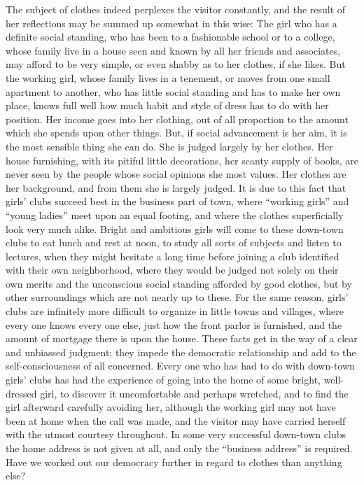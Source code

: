 \documentclass[]{article}
\begin{document}
\begin{sectionbody}
\addamsparagraph The subject of clothes indeed perplexes the visitor constantly, and the
result of her reflections may be summed up somewhat in this wise: The
girl who has a definite social standing, who has been to a fashionable
school or to a college, whose family live in a house seen and known by
all her friends and associates, may afford to be very simple, or even
shabby as to her clothes, if she likes. But the working girl, whose
family lives in a tenement, or moves from one small apartment to
another, who has little social standing and has to make her own place,
knows full well how much habit and style of dress has to do with her
position. Her income goes into her clothing, out of all proportion to
the amount which she spends upon other things. But, if social
advancement is her aim, it is the most sensible thing she can do. She is
judged largely by her clothes. Her house furnishing, with its pitiful
little decorations, her scanty supply of books, are never seen by the
people whose social opinions she most values. Her clothes are her
background, and from them she is largely judged. It is due to this fact
that girls' clubs succeed best in the business part of town, where
``working girls'' and ``young ladies'' meet upon an equal footing, and where
the clothes superficially look very much alike. Bright and ambitious
girls will come to these down-town clubs to eat lunch and rest at noon,
to study all sorts of subjects and listen to lectures, when they might
hesitate a long time before joining a club identified with their own
neighborhood, where they would be judged not solely on their own merits
and the unconscious social standing afforded by good clothes, but by
other surroundings which are not nearly up to these. For the same
reason, girls' clubs are infinitely more difficult to organize in little
towns and villages, where every one knows every one else, just how the
front parlor is furnished, and the amount of mortgage there is upon the
house. These facts get in the way of a clear and unbiassed judgment;
they impede the democratic relationship and add to the
self-consciousness of all concerned. Every one who has had to do with
down-town girls' clubs has had the experience of going into the home of
some bright, well-dressed girl, to discover it uncomfortable and perhaps
wretched, and to find the girl afterward carefully avoiding her,
although the working girl may not have been at home when the call was
made, and the visitor may have carried herself with the utmost courtesy
throughout. In some very successful down-town clubs the home address is
not given at all, and only the ``business address'' is required. Have we
worked out our democracy further in regard to clothes than anything
else?


\end{sectionbody}
\end{document}

